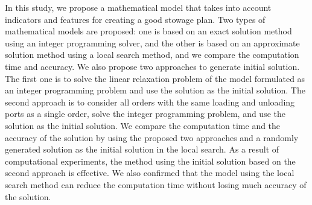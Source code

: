 In this study, we propose a mathematical model that takes into account indicators and features for creating a good stowage plan. Two types of mathematical models are proposed: one is based on an exact solution method using an integer programming solver, and the other is based on an approximate solution method using a local search method, and we compare the computation time and accuracy.
We also propose two approaches to generate initial solution. The first one is to solve the linear relaxation problem of the model formulated as an integer programming problem and use the solution as the initial solution. The second approach is to consider all orders with the same loading and unloading ports as a single order, solve the integer programming problem, and use the solution as the initial solution. We compare the computation time and the accuracy of the solution by using the proposed two approaches and a randomly generated solution as the initial solution in the local search.
As a result of computational experiments, the method using the initial solution based on the second approach is effective.
We also confirmed that the model using the local search method can reduce the computation time without losing much accuracy of the solution.
